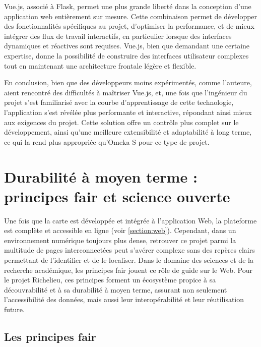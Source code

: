 Vue.js, associé à Flask, permet une plus grande liberté dans la conception d'une application web entièrement sur mesure. Cette combinaison permet de développer des fonctionnalités spécifiques au projet, d'optimiser la performance, et de mieux intégrer des flux de travail interactifs, en particulier lorsque des interfaces dynamiques et réactives sont requises. Vue.js, bien que demandant une certaine expertise, donne la possibilité de construire des interfaces utilisateur complexes tout en maintenant une architecture frontale légère et flexible.

En conclusion, bien que des développeurs moins expérimentés, comme l'auteure, aient rencontré des difficultés à maîtriser Vue.js, et, une fois que l'ingénieur du projet s'est familiarisé avec la courbe d'apprentissage de cette technologie, l'application s'est révélée plus performante et interactive, répondant ainsi mieux aux exigences du projet. Cette solution offre un contrôle plus complet sur le développement, ainsi qu'une meilleure extensibilité et adaptabilité à long terme, ce qui la rend plus appropriée qu'Omeka S pour ce type de projet.

\section{Durabilité à moyen terme : principes  \acrshort{fair} et science ouverte}\label{section:intero}

Une fois que la carte est développée et intégrée à l'application Web, la plateforme est complète et accessible en ligne (voir \ref{section:web}). Cependant, dans un environnement numérique toujours plus dense, retrouver ce projet parmi la multitude de pages interconnectées peut s'avérer complexe sans des repères clairs permettant de l'identifier et de le localiser. Dans le domaine des sciences et de la recherche académique, les principes  \acrshort{fair} jouent ce rôle de guide sur le Web. Pour le projet Richelieu, ces principes forment un écosystème propice à sa découvrabilité et à sa durabilité à moyen terme, assurant non seulement l'accessibilité des données, mais aussi leur interopérabilité et leur réutilisation future. 

\subsection{Les principes \acrshort{fair}}

